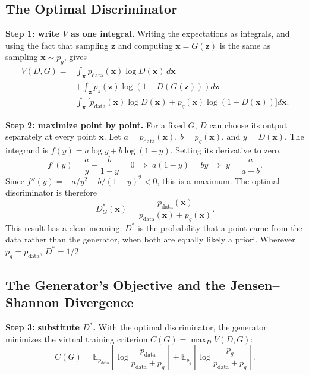 \documentclass[conference]{IEEEtran}
\newcommand{\E}{\mathbb{E}}
\newcommand{\pdata}{p_{\mathrm{data}}}
\begin{document}
\subsection{The Optimal Discriminator}
\textbf{Step 1: write $V$ as one integral.} Writing the expectations as integrals, and using the fact that sampling $\mathbf{z}$ and computing $\mathbf{x}=G(\mathbf{z})$ is the same as sampling $\mathbf{x}\sim p_g$, gives
\begin{align}
V(D,G)={}&\int_{\mathbf{x}}\pdata(\mathbf{x})\log D(\mathbf{x})\,d\mathbf{x}\nonumber\\
&+\int_{\mathbf{z}}p_z(\mathbf{z})\log\left(1-D(G(\mathbf{z}))\right)d\mathbf{z}\nonumber\\
={}&\int_{\mathbf{x}}\Big[\pdata(\mathbf{x})\log D(\mathbf{x})+p_g(\mathbf{x})\log\left(1-D(\mathbf{x})\right)\Big]d\mathbf{x}.
\end{align}

\textbf{Step 2: maximize point by point.} For a fixed $G$, $D$ can choose its output separately at every point $\mathbf{x}$. Let $a=\pdata(\mathbf{x})$, $b=p_g(\mathbf{x})$, and $y=D(\mathbf{x})$. The integrand is $f(y)=a\log y+b\log(1-y)$. Setting its derivative to zero,
\begin{equation}
f'(y)=\frac{a}{y}-\frac{b}{1-y}=0\;\Rightarrow\;a(1-y)=by\;\Rightarrow\;y=\frac{a}{a+b}.
\end{equation}
Since $f''(y)=-a/y^2-b/(1-y)^2<0$, this is a maximum. The optimal discriminator is therefore~\cite[Prop.~1]{goodfellow2014}
\begin{equation}
D^*_G(\mathbf{x})=\frac{\pdata(\mathbf{x})}{\pdata(\mathbf{x})+p_g(\mathbf{x})}.
\label{eq:dstar}
\end{equation}
This result has a clear meaning: $D^*$ is the probability that a point came from the data rather than the generator, when both are equally likely a priori. Wherever $p_g=\pdata$, $D^*=1/2$.

\subsection{The Generator's Objective and the Jensen--Shannon Divergence}
\textbf{Step 3: substitute $D^*$.} With the optimal discriminator, the generator minimizes the virtual training criterion $C(G)=\max_D V(D,G)$:
\begin{equation}
C(G)=\E_{\pdata}\!\left[\log\frac{\pdata}{\pdata+p_g}\right]+\E_{p_g}\!\left[\log\frac{p_g}{\pdata+p_g}\right].
\end{equation}
\end{document}
